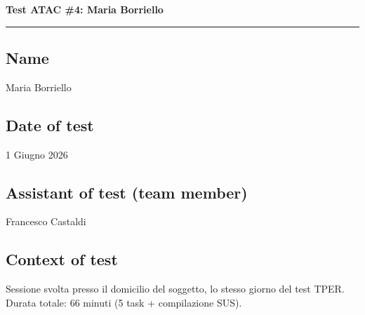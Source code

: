 \documentclass[11pt,a4paper]{article}
\begin{document}

\newpage
\begin{center}
  {\color{secondaryColor}\large\bfseries
  Test ATAC \#4: Maria Borriello}\\
  \vspace{0.1cm}
  \color{borderColor}\hrule
\end{center}

\vspace{0.5cm}

\subsection*{Name}
\begin{tcolorbox}[colback=backgroundColor,colframe=borderColor,arc=2mm]
Maria Borriello
\end{tcolorbox}

\subsection*{Date of test}
\begin{tcolorbox}[colback=backgroundColor,colframe=borderColor,arc=2mm]
1 Giugno 2026
\end{tcolorbox}

\subsection*{Assistant of test (team member)}
\begin{tcolorbox}[colback=backgroundColor,colframe=borderColor,arc=2mm]
Francesco Castaldi
\end{tcolorbox}

\subsection*{Context of test}
\begin{tcolorbox}[colback=backgroundColor,colframe=borderColor,arc=2mm]
Sessione svolta presso il domicilio del soggetto, lo stesso giorno del test TPER. Durata totale: 66 minuti (5 task + compilazione SUS).
\end{tcolorbox}
\end{document}
